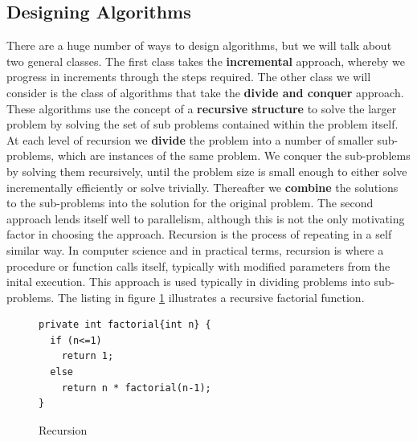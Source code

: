 \documentclass[10pt,a4paper]{article}
\begin{document}
\subsection{Designing Algorithms}
There are a huge number of ways to design algorithms, but we will talk about two general classes. The first class takes the {\bf incremental} approach, whereby we progress in increments through the steps required. The other class we will consider is the class of algorithms that take the {\bf divide and conquer} approach. These algorithms use the concept of a {\bf recursive structure} to solve the larger problem by solving the set of sub problems contained within the problem itself. At each level of recursion we {\bf divide} the problem into a number of smaller sub-problems, which are instances of the same problem. We conquer the sub-problems by solving them recursively, until the problem size is small enough to either solve incrementally efficiently or solve trivially. Thereafter we {\bf combine} the solutions  to the sub-problems into the solution for the original problem. The second approach lends itself well to parallelism, although this is not the only motivating factor in choosing the approach. 
\newline\newline
Recursion is the process of repeating in a self similar way. In computer science and in practical terms, recursion is where a procedure or function calls itself, typically with modified parameters from the inital execution. This approach is used typically in dividing problems into sub-problems. The listing in figure \ref{faclisting} illustrates a recursive factorial function. 

\begin{figure}
\caption{Recursion}
\begin{center}
\begin{lstlisting}
private int factorial{int n} {
  if (n<=1) 
    return 1;
  else 
    return n * factorial(n-1);
}
\end{lstlisting}
\label{faclisting}
\end{center}
\end{figure}
\end{document}

